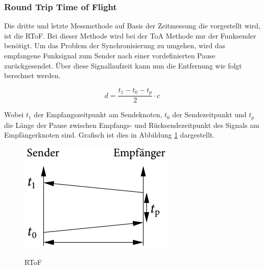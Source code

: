 \subsubsection{Round Trip Time of Flight}
Die dritte und letzte Messmethode auf Basis der Zeitmessung die
vorgestellt wird, ist die \ac{RToF}. Bei dieser Methode wird bei der
ToA Methode nur der Funksender benötigt. Um das Problem der
Synchronisierung zu umgehen, wird das empfangene Funksignal zum Sender
nach einer vordefinierten Pause zurückgesendet. Über diese
Signallaufzeit kann nun die Entfernung wie folgt berechnet werden.

\begin{equation}
  \label{eq:RToF}
    d = \frac{t_{1} - t_{0} - t_{p}}{2} \cdot c
\end{equation}

Wobei $t_{1}$ der Empfangszeitpunkt am Sendeknoten, $t_{0}$ der
Sendezeitpunkt und $t_{p}$ die Länge der Pause zwischen Empfangs- und
Rücksendezeitpunkt des Signals am Empfängerknoten sind.
Grafisch ist dies in Abbildung \ref{fig:RToF} dargestellt.

\begin{figure}[h!]
  \centering
  \includegraphics[scale=0.5]{img/time3}
  \label{fig:RToF}
  \caption{RToF}
\end{figure}
